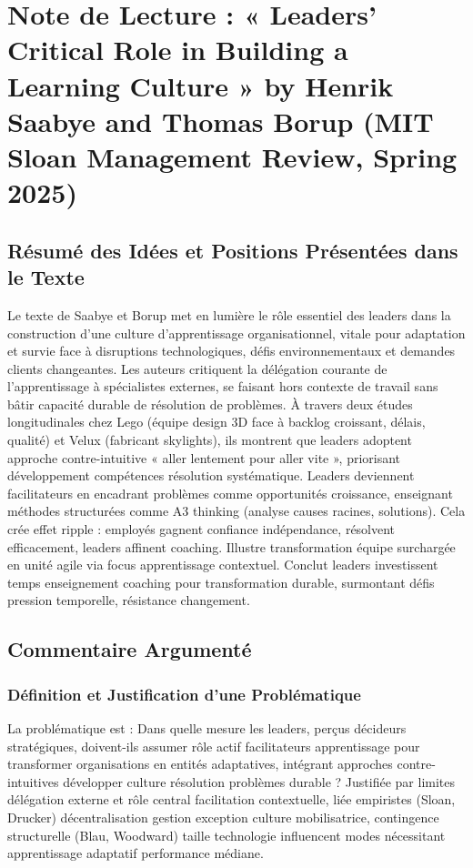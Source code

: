 \documentclass[11pt]{rapportECL}
\begin{document}
\section{Note de Lecture : « Leaders’ Critical Role in Building a Learning Culture » by Henrik Saabye and Thomas Borup (MIT Sloan Management Review, Spring 2025)}

\subsection{Résumé des Idées et Positions Présentées dans le Texte}
Le texte de Saabye et Borup met en lumière le rôle essentiel des leaders dans la construction d’une culture d’apprentissage organisationnel, vitale pour adaptation et survie face à disruptions technologiques, défis environnementaux et demandes clients changeantes. Les auteurs critiquent la délégation courante de l’apprentissage à spécialistes externes, se faisant hors contexte de travail sans bâtir capacité durable de résolution de problèmes. À travers deux études longitudinales chez Lego (équipe design 3D face à backlog croissant, délais, qualité) et Velux (fabricant skylights), ils montrent que leaders adoptent approche contre-intuitive « aller lentement pour aller vite », priorisant développement compétences résolution systématique. Leaders deviennent facilitateurs en encadrant problèmes comme opportunités croissance, enseignant méthodes structurées comme A3 thinking (analyse causes racines, solutions). Cela crée effet ripple : employés gagnent confiance indépendance, résolvent efficacement, leaders affinent coaching. Illustre transformation équipe surchargée en unité agile via focus apprentissage contextuel. Conclut leaders investissent temps enseignement coaching pour transformation durable, surmontant défis pression temporelle, résistance changement.

\subsection{Commentaire Argumenté}

\subsubsection{Définition et Justification d’une Problématique}
La problématique est : Dans quelle mesure les leaders, perçus décideurs stratégiques, doivent-ils assumer rôle actif facilitateurs apprentissage pour transformer organisations en entités adaptatives, intégrant approches contre-intuitives développer culture résolution problèmes durable ? Justifiée par limites délégation externe et rôle central facilitation contextuelle, liée empiristes (Sloan, Drucker) décentralisation gestion exception culture mobilisatrice, contingence structurelle (Blau, Woodward) taille technologie influencent modes nécessitant apprentissage adaptatif performance médiane.
\end{document}
